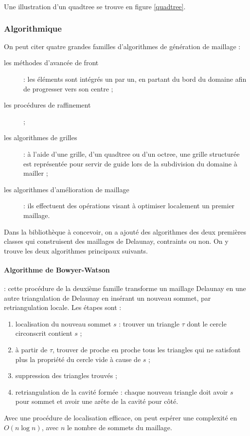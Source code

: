 \documentclass[12pt,a4paper]{report}
\begin{document}
Une illustration d'un quadtree se trouve en figure \ref{quadtree}.

\subsubsection{Algorithmique}

On peut citer quatre grandes familles d'algorithmes de génération de maillage :
\begin{description}
\item[les méthodes d'avancée de front] : les éléments sont intégrés un par un, en partant du bord du domaine afin de progresser vers son centre ;
\item[les procédures de raffinement] ;
\item[les algorithmes de grilles] : à l'aide d'une grille, d'un quadtree ou d'un octree, une grille structurée est représentée pour servir de guide lors de la subdivision du domaine à mailler ;
\item[les algorithmes d'amélioration de maillage] : ils effectuent des opérations visant à optimiser localement un premier maillage.
\end{description}



Dans la bibliothèque à concevoir, on a ajouté des algorithmes des deux premières classes qui construisent des maillages de Delaunay, contraints ou non. On y trouve les deux algorithmes principaux suivants.

\paragraph{\indent Algorithme de Bowyer-Watson}\label{Bowyer-Watson} : cette procédure de la deuxième famille transforme un maillage Delaunay en une autre triangulation de Delaunay en insérant un nouveau sommet, par retriangulation locale. Les étapes sont :
\begin{enumerate}
\item localisation du nouveau sommet $s$ : trouver un triangle $\tau$ dont le cercle circonscrit contient $s$ ;
\item à partir de $\tau$, trouver de proche en proche tous les triangles qui ne satisfont plus la propriété du cercle vide à cause de $s$ ;
\item suppression des triangles trouvés ;
\item retriangulation de la cavité formée : chaque nouveau triangle doit avoir $s$ pour sommet et avoir une arête de la cavité pour côté.
\end{enumerate}
Avec une procédure de localisation efficace, on peut espérer une complexité en $O(n\log n)$, avec $n$ le nombre de sommets du maillage.
\end{document}
